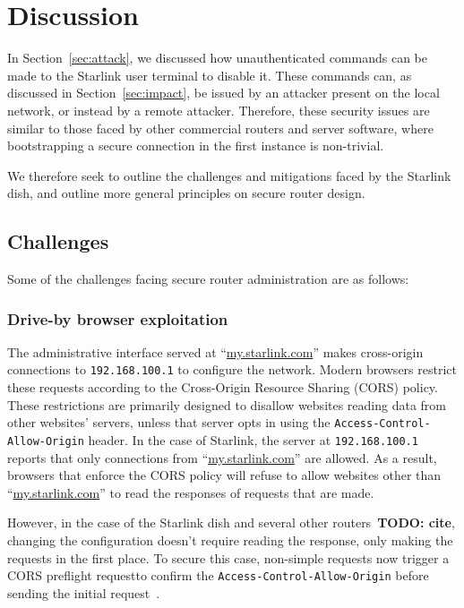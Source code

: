 \section{Discussion}\label{sec:discussion}

In Section~\ref{sec:attack}, we discussed how unauthenticated commands can be made to the Starlink user terminal to disable it.
These commands can, as discussed in Section~\ref{sec:impact}, be issued by an attacker present on the local network, or instead by a remote attacker.
Therefore, these security issues are similar to those faced by other commercial routers and server software, where bootstrapping a secure connection in the first instance is non-trivial.

We therefore seek to outline the challenges and mitigations faced by the Starlink dish, and outline more general principles on secure router design.

\subsection{Challenges}

Some of the challenges facing secure router administration are as follows:

\subsubsection{Drive-by browser exploitation}

The administrative interface served at ``\url{my.starlink.com}'' makes cross-origin connections to \texttt{192.168.100.1} to configure the network.
Modern browsers restrict these requests according to the Cross-Origin Resource Sharing (CORS) policy.
These restrictions are primarily designed to disallow websites reading data from other websites' servers, unless that server opts in using the \texttt{Access-Control-Allow-Origin} header.
In the case of Starlink, the server at \texttt{192.168.100.1} reports that only connections from ``\url{my.starlink.com}'' are allowed.
As a result, browsers that enforce the CORS policy will refuse to allow websites other than ``\url{my.starlink.com}'' to read the responses of requests that are made.

However, in the case of the Starlink dish and several other routers~\textbf{TODO: cite}, changing the configuration doesn't require reading the response, only making the requests in the first place.
To secure this case, non-simple requests now trigger a CORS preflight requestto confirm the \texttt{Access-Control-Allow-Origin} before sending the initial request~\cite{simple_requests, preflight_request}.

